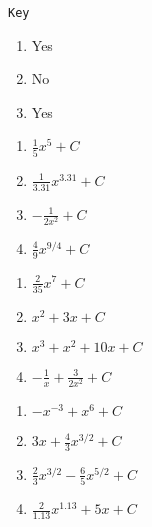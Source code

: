 \documentclass{article}
\newcounter{key}
\begin{document}
\vfill

\dotfill \newline

\texttt{Key}
\begin{multicols}{3}
\begin{enumerate} 
    \item Yes
    \item No
    \item Yes
\end{enumerate}     \setcounter{key}{\value{enumi}}
\end{multicols}
\begin{multicols}{4}
\begin{enumerate}   \setcounter{enumi}{\value{key}}
    \item $\frac{1}{5}x^5 + C$
    \item $\frac{1}{3.31}x^{3.31} + C$
    \item $-\frac{1}{2x^2} + C$
    \item $\frac{4}{9}x^{9/4} + C$
\end{enumerate}     \setcounter{key}{\value{enumi}}
\end{multicols}
\begin{multicols}{4}
\begin{enumerate}   \setcounter{enumi}{\value{key}}
    \item $\frac{2}{35}x^7 + C$
    \item $x^2 + 3x + C$
    \item $x^3 + x^2 + 10x + C$
    \item $-\frac{1}{x} + \frac{3}{2x^2} + C$
\end{enumerate}     \setcounter{key}{\value{enumi}}
\end{multicols}
\begin{multicols}{4}
\begin{enumerate}   \setcounter{enumi}{\value{key}}
    \item $-x^{-3}+x^6 + C$
    \item $3x + \frac{4}{3}x^{3/2} + C$
    \item $\frac{2}{3}x^{3/2} - \frac{6}{5}x^{5/2} + C$
    \item $\frac{2}{1.13}x^{1.13}+5x+C$
\end{enumerate}     \setcounter{key}{\value{enumi}}
\end{multicols}
\end{document}
